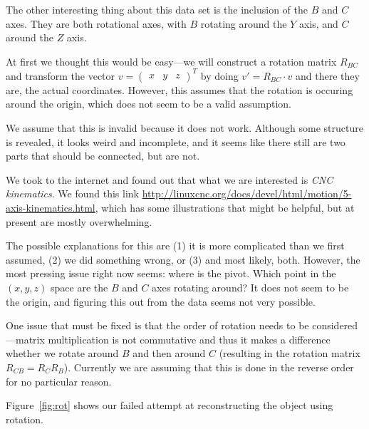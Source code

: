 \documentclass[english]{scrartcl}
\begin{document}
The other interesting thing about this data set is the inclusion of the $B$ and $C$ axes. They
are both rotational axes, with $B$ rotating around the $Y$ axis, and $C$ around the $Z$ axis.

At first we thought this would be easy---we will construct a rotation matrix $R_{BC}$ and transform the vector
$v = \begin{pmatrix} x & y & z \end{pmatrix}^T$ by doing $v' = R_{BC} \cdot v$ and there they are, the actual coordinates.
However, this assumes that the rotation is occuring around the origin, which does not seem to be a valid assumption.

We assume that this is invalid because it does not work. Although some structure is revealed, it looks weird
and incomplete, and it seems like there still are two parts that should be connected, but are not.

We took to the internet and found out that what we are interested is \emph{CNC kinematics}. We found this link
\url{http://linuxcnc.org/docs/devel/html/motion/5-axis-kinematics.html}, which has some illustrations that might
be helpful, but at present are mostly overwhelming.

The possible explanations for this are (1) it is more complicated than we first assumed, (2) we did something wrong, or
(3) and most likely, both. However, the most pressing issue right now seems: where is the pivot. Which point in the
$(x, y, z)$ space are the $B$ and $C$ axes rotating around? It does not seem to be the origin, and figuring this out
from the data seems not very possible.

One issue that must be fixed is that the order of rotation needs to be considered---matrix multiplication is not
commutative and thus it makes a difference whether we rotate around $B$ and then around $C$ (resulting in the
rotation matrix $R_{CB} = R_CR_B$). Currently we are assuming that this is done in the reverse order for no particular
reason.

Figure~\ref{fig:rot} shows our failed attempt at reconstructing the object using rotation.
\end{document}
